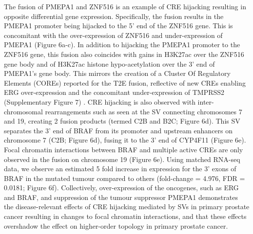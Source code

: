 The fusion of PMEPA1 and ZNF516 is an example of CRE hijacking resulting in opposite differential gene expression.
Specifically, the fusion results in the PMEPA1 promoter being hijacked to the 5' end of the ZNF516 gene.
This is concomitant with the over-expression of ZNF516 and under-expression of PMEPA1 (Figure 6a-c).
In addition to hijacking the PMEPA1 promoter to the ZNF516 gene, this fusion also coincides with gains in H3K27ac over the ZNF516 gene body and of H3K27ac histone hypo-acetylation over the 3' end of PMEPA1's gene body.
This mirrors the creation of a Cluster Of Regulatory Elements (COREs) reported for the T2E fusion, reflective of new CREs enabling ERG over-expression and the concomitant under-expression of TMPRSS2 (Supplementary Figure 7) \cite{kronTMPRSS2ERGFusion2017,tomlinsRecurrentFusionTMPRSS22005,tomlinsDistinctClassesChromosomal2007}.
CRE hijacking is also observed with inter-chromosomal rearrangements such as seen at the SV connecting chromosomes 7 and 19, creating 2 fusion products (termed C2B and B2C; Figure 6d).
This SV separates the 3' end of BRAF from its promoter and upstream enhancers on chromosome 7 (C2B; Figure 6d), fusing it to the 3' end of CYP4F11 (Figure 6e).
Focal chromatin interactions between BRAF and multiple active CREs are only observed in the fusion on chromosome 19 (Figure 6e).
Using matched RNA-seq data, we observe an estimated 5 fold increase in expression for the 3' exons of BRAF in the mutated tumour compared to others (fold-change = 4.976, FDR = 0.0181; Figure 6f).
Collectively, over-expression of the oncogenes, such as ERG and BRAF, and suppression of the tumour suppressor PMEPA1 demonstrates the disease-relevant effects of CRE hijacking mediated by SVs in primary prostate cancer resulting in changes to focal chromatin interactions, and that these effects overshadow the effect on higher-order topology in primary prostate cancer.
